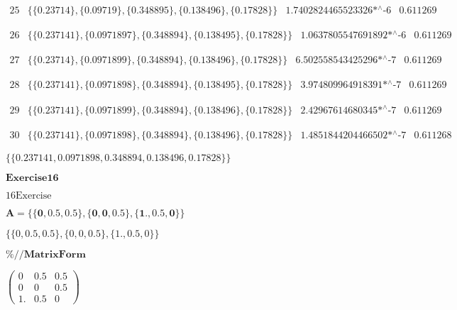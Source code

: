 \documentclass{article}
\begin{document}
\noindent\(
\begin{array}{cccc}
 25 & \{\{0.23714\},\{0.09719\},\{0.348895\},\{0.138496\},\{0.17828\}\} & \text{1.7402824465523326$\grave{ }$*${}^{\wedge}$-6} & 0.611269
\end{array}
\)

\noindent\(
\begin{array}{cccc}
 26 & \{\{0.237141\},\{0.0971897\},\{0.348894\},\{0.138495\},\{0.17828\}\} & \text{1.0637805547691892$\grave{ }$*${}^{\wedge}$-6} & 0.611269
\end{array}
\)

\noindent\(
\begin{array}{cccc}
 27 & \{\{0.23714\},\{0.0971899\},\{0.348894\},\{0.138496\},\{0.17828\}\} & \text{6.502558543425296$\grave{ }$*${}^{\wedge}$-7} & 0.611269
\end{array}
\)

\noindent\(
\begin{array}{cccc}
 28 & \{\{0.237141\},\{0.0971898\},\{0.348894\},\{0.138495\},\{0.17828\}\} & \text{3.974809964918391$\grave{ }$*${}^{\wedge}$-7} & 0.611269
\end{array}
\)

\noindent\(
\begin{array}{cccc}
 29 & \{\{0.237141\},\{0.0971899\},\{0.348894\},\{0.138496\},\{0.17828\}\} & \text{2.42967614680345$\grave{ }$*${}^{\wedge}$-7} & 0.611269
\end{array}
\)

\noindent\(
\begin{array}{cccc}
 30 & \{\{0.237141\},\{0.0971898\},\{0.348894\},\{0.138496\},\{0.17828\}\} & \text{1.4851844204466502$\grave{ }$*${}^{\wedge}$-7} & 0.611268
\end{array}
\)

\noindent\(\{\{0.237141,0.0971898,0.348894,0.138496,0.17828\}\}\)

\noindent\(\pmb{\text{Exercise} 16}\)

\noindent\(16 \text{Exercise}\)

\noindent\(\pmb{A=\{\{0,0.5,0.5\},\{0,0,0.5\},\{1.,0.5,0\}\}}\)

\noindent\(\{\{0,0.5 ,0.5 \},\{0,0,0.5 \},\{1. ,0.5 ,0\}\}\)

\noindent\(\pmb{\%\text{//}\text{MatrixForm}}\)

\noindent\(\left(
\begin{array}{ccc}
 0 & 0.5  & 0.5  \\
 0 & 0 & 0.5  \\
 1.  & 0.5  & 0
\end{array}
\right)\)
\end{document}
